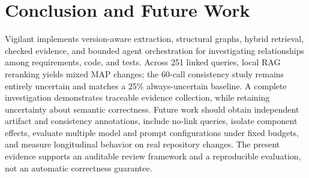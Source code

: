 \documentclass[conference,letterpaper,10pt]{IEEEtran}
\begin{document}
\section{Conclusion and Future Work}
Vigilant implements version-aware extraction, structural graphs, hybrid retrieval, checked evidence, and bounded agent orchestration for investigating relationships among requirements, code, and tests. Across 251 linked queries, local RAG reranking yields mixed MAP changes; the 60-call consistency study remains entirely uncertain and matches a 25\% always-uncertain baseline. A complete investigation demonstrates traceable evidence collection, while retaining uncertainty about semantic correctness. Future work should obtain independent artifact and consistency annotations, include no-link queries, isolate component effects, evaluate multiple model and prompt configurations under fixed budgets, and measure longitudinal behavior on real repository changes. The present evidence supports an auditable review framework and a reproducible evaluation, not an automatic correctness guarantee.
\balance
\end{document}
